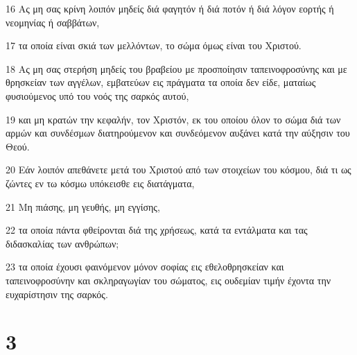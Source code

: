 \par 16 Ας μη σας κρίνη λοιπόν μηδείς διά φαγητόν ή διά ποτόν ή διά λόγον εορτής ή νεομηνίας ή σαββάτων,
\par 17 τα οποία είναι σκιά των μελλόντων, το σώμα όμως είναι του Χριστού.
\par 18 Ας μη σας στερήση μηδείς του βραβείου με προσποίησιν ταπεινοφροσύνης και με θρησκείαν των αγγέλων, εμβατεύων εις πράγματα τα οποία δεν είδε, ματαίως φυσιούμενος υπό του νοός της σαρκός αυτού,
\par 19 και μη κρατών την κεφαλήν, τον Χριστόν, εκ του οποίου όλον το σώμα διά των αρμών και συνδέσμων διατηρούμενον και συνδεόμενον αυξάνει κατά την αύξησιν του Θεού.
\par 20 Εάν λοιπόν απεθάνετε μετά του Χριστού από των στοιχείων του κόσμου, διά τι ως ζώντες εν τω κόσμω υπόκεισθε εις διατάγματα,
\par 21 Μη πιάσης, μη γευθής, μη εγγίσης,
\par 22 τα οποία πάντα φθείρονται διά της χρήσεως, κατά τα εντάλματα και τας διδασκαλίας των ανθρώπων;
\par 23 τα οποία έχουσι φαινόμενον μόνον σοφίας εις εθελοθρησκείαν και ταπεινοφροσύνην και σκληραγωγίαν του σώματος, εις ουδεμίαν τιμήν έχοντα την ευχαρίστησιν της σαρκός.

\chapter{3}

